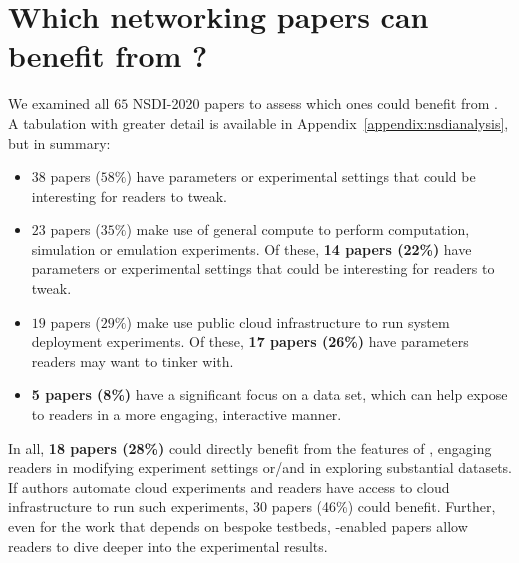 \section{Which networking papers can benefit from \sysname?}\vspace{4pt}

We examined all $65$ NSDI-2020 papers to assess which ones could benefit from \sysname. A tabulation with greater detail is available in Appendix~\ref{appendix:nsdianalysis}, but in summary:

\begin{itemize}[leftmargin=10pt,itemsep=2pt,topsep=2pt]

    \item $38$ papers ($58\%$) have parameters or experimental settings that could be interesting for readers to tweak.
    
    \item $23$ papers ($35\%$) make use of general compute to perform computation, simulation or emulation experiments. Of these, \textbf{14 papers (22\%)} have parameters or experimental settings that could be interesting for readers to tweak.
    
    \item $19$ papers ($29\%$) make use public cloud infrastructure to run system deployment experiments. Of these, \textbf{17 papers (26\%)} have parameters readers may want to tinker with.
    
    \item \textbf{5 papers (8\%)} have a significant focus on a data set, which \sysname can help expose to readers in a more engaging, interactive manner.
    
\end{itemize}

\noindent In all, \textbf{18 papers (28\%)} could directly benefit from the features of \sysname, engaging readers in modifying experiment settings or/and in exploring substantial datasets. If authors automate cloud experiments and readers have access to cloud infrastructure to run such experiments, 30 papers (46\%) could benefit. Further, even for the work that depends on bespoke testbeds, \sysname-enabled papers allow readers to dive deeper into the experimental results.
